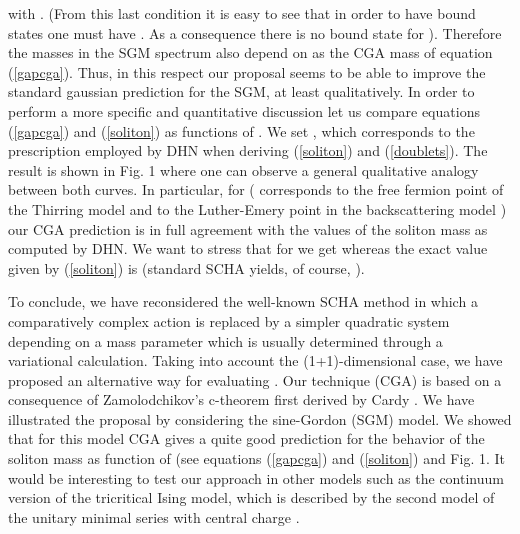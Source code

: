 \documentclass[a4paper,12pt]{article}
\begin{document}
\noindent with \coordHE{}. (From this last condition it is easy to see that
in order to have \coordHE{} bound states one must have \coordHE{}. As a consequence there is
no bound state for \coordHE{}). Therefore the masses in the SGM spectrum also depend on \coordHE{}
as the CGA mass of equation (\ref{gapcga}). Thus, in this respect our proposal seems
to be able to improve the standard gaussian prediction for the SGM, at least
qualitatively. In order to perform a more specific and quantitative  discussion let us
compare equations (\ref{gapcga}) and (\ref{soliton}) as functions of \coordHE{}. We set
\myHighlight{$\rho=\sqrt{\alpha}$}\coordHE{}, which corresponds to the prescription employed by DHN when
deriving (\ref{soliton}) and (\ref{doublets}). The result is shown in Fig. 1 where one
can observe a general qualitative analogy between both curves. In particular, for
\coordHE{} (\coordHE{} corresponds to the free fermion point of the Thirring model
and to the Luther-Emery point in the backscattering model \cite{Luther-Emery}) our CGA
prediction is in full agreement with the values of the soliton mass as computed by
DHN. We want to stress that for \coordHE{} we get
\coordHE{} whereas the exact value given by
(\ref{soliton}) is \coordHE{} (standard SCHA yields, of course,
\coordHE{}).


\vspace{1cm} To conclude, we have reconsidered the well-known SCHA method in which a
comparatively complex action is replaced by a simpler quadratic system depending on a
mass parameter \myHighlight{$\Omega$}\coordHE{} which is usually determined through a variational calculation.
Taking into account the (1+1)-dimensional case, we have proposed an alternative way
for evaluating \myHighlight{$\Omega$}\coordHE{}. Our technique (CGA) is based on a consequence of
Zamolodchikov's \cite{Zamolodchikov} c-theorem first derived by Cardy \cite{Cardy}. We
have illustrated the proposal by considering the sine-Gordon (SGM) model. We showed
that for this model CGA gives a quite good prediction for the behavior of the soliton
mass as function of \coordHE{} (see equations (\ref{gapcga}) and (\ref{soliton}) and
Fig. 1. It would be interesting to test our approach in other models such as the
continuum version of the tricritical Ising model, which is described by the second
model of the unitary minimal series \cite{BPZ} \cite{FQS} with central charge
\coordHE{}. \vspace{0.5cm}
\end{document}
